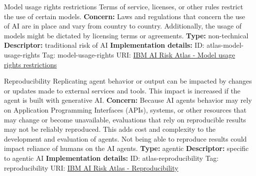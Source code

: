 \begin{definitionbox}{Model usage rights restrictions}
Terms of service, licenses, or other rules restrict the use of certain models.\newline\newline
\textbf{Concern: }Laws and regulations that concern the use of AI are in place and vary from country to country. Additionally, the usage of models might be dictated by licensing terms or agreements.\newline\newline
\textbf{Type: }non-technical\newline
\textbf{Descriptor: }traditional risk of AI \newline\newline
\textbf{Implementation details: } \newline
ID: atlas-model-usage-rights \newline
Tag: model-usage-rights \newline
URI:  \href{https://www.ibm.com/docs/en/watsonx/saas?topic=SSYOK8/wsj/ai-risk-atlas/model-usage-rights.html}{IBM AI Risk Atlas - Model usage rights restrictions}\newline
\end{definitionbox}
\begin{definitionbox}{Reproducibility}
Replicating agent behavior or output can be impacted by changes or updates made to external services and tools. This impact is increased if the agent is built with generative AI.\newline\newline
\textbf{Concern: }Because AI agents behavior may rely on Application Programming Interfaces (APIs), systems, or other resources that may change or become unavailable, evaluations that rely on reproducible results may not be reliably reproduced. This adds cost and complexity to the development and evaluation of agents. Not being able to reproduce results could impact reliance of humans on the AI agents.\newline\newline
\textbf{Type: }agentic\newline
\textbf{Descriptor: }specific to agentic AI \newline\newline
\textbf{Implementation details: } \newline
ID: atlas-reproducibility \newline
Tag: reproducibility \newline
URI:  \href{https://www.ibm.com/docs/en/watsonx/saas?topic=SSYOK8/wsj/ai-risk-atlas/reproducibility.html}{IBM AI Risk Atlas - Reproducibility}\newline
\end{definitionbox}
